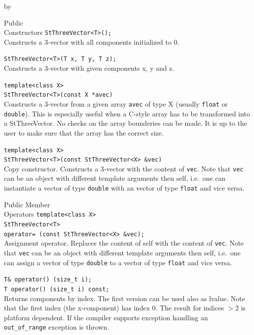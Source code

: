 \documentclass[twoside]{article}
\newcommand{\comp}[1]{\texttt{#1}}%
\newcommand{\entrylabel}[1]{\mbox{\textbf{{#1}}}\hfil}%
\newenvironment{entry}
{\begin{list}{}%
    {\renewcommand{\makelabel}{\entrylabel}%
     \setlength{\labelwidth}{90pt}%
     \setlength{\leftmargin}{\labelwidth}
     \advance\leftmargin by \labelsep%
      }%
    }%
  {\end{list}}
\newcommand{\Entrylabel}[1]%
{\raisebox{0pt}[1ex][0pt]{\makebox[\labelwidth][l]%
    {\parbox[t]{\labelwidth}{\hspace{0pt}\textbf{{#1}}}}}}
\newenvironment{Entry}%
{\renewcommand{\entrylabel}{\Entrylabel}\begin{entry}}%
  {\end{entry}}
\begin{document}
\begin{Entry}
\item[Public\\ Constructors]
    \verb+StThreeVector<T>();+ \\
    Constructs a 3-vector with all components initialized to 0.
    
    \verb+StThreeVector<T>(T x, T y, T z);+ \\
    Constructs a 3-vector with given components x, y and z.
    
    \verb+template<class X>+\\
    \verb+StThreeVector<T>(const X *avec)+\\
    Constructs a 3-vector from a given array \comp{avec} of type
    X (usually \comp{float} or \comp{double}).
    This is especially useful when a C-style array has to
    be transformed into a StThreeVector. 
    No checks on the array bounderies can be made.
    It is up to the user to make sure that the array
    has the correct size.
    
    \verb+template<class X>+\\
    \verb+StThreeVector<T>(const StThreeVector<X> &vec)+\\
    Copy constructor.
    Constructs a 3-vector with the content of \comp{vec}.
    Note that \comp{vec} can be an object with different
    template arguments then self, i.e.~one can instantiate
    a vector of type \comp{double} with an vector of type
    \comp{float} and vice versa.   
    
\item[Public Member\\ Operators]
    \verb+template<class X>+\\
    \verb+StThreeVector<T>+\\
    \verb+operator= (const StThreeVector<X> &vec);+ \\
    Assignment operator. Replaces the content of self with the content of \comp{vec}.
    Note that \comp{vec} can be an object with different
    template arguments then self, i.e.~one can assign
    a vector of type \comp{double} to a vector of type
    \comp{float} and vice versa.  
    
    \verb+T& operator() (size_t i);+\\
    \verb+T operator() (size_t i) const;+\\    
    Returns components by index. The first version can be used also as
    lvalue.  Note that the first index (the x-component) has index 0.
    The result for indices $> 2$ is platform dependent. If the
    compiler supports exception handling an \comp{out\_of\_range}
    exception is thrown.
    

\end{Entry}
\end{document}
